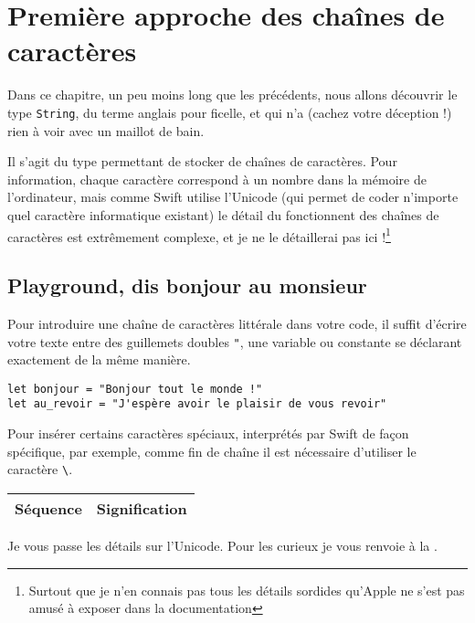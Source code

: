 \chapter{Première approche des chaînes de caractères}
Dans ce chapitre, un peu moins long que les précédents, nous allons découvrir le type \texttt{String}, du terme anglais pour ficelle, et qui n'a (cachez votre déception !) rien à voir avec un maillot de bain.

Il s'agit du type permettant de stocker de chaînes de caractères. Pour information, chaque caractère correspond à un nombre dans la mémoire de l'ordinateur, mais comme Swift utilise l'Unicode (qui permet de coder n'importe quel caractère informatique existant) le détail du fonctionnent des chaînes de caractères est extrêmement complexe, et je ne le détaillerai pas ici !\footnote{Surtout que je n'en connais pas tous les détails sordides qu'Apple ne s'est pas amusé à exposer dans la documentation}
\section{Playground, dis bonjour au monsieur}
Pour introduire une chaîne de caractères littérale dans votre code, il suffit d'écrire votre texte entre des guillemets doubles \verb'"', une variable ou constante se déclarant exactement de la même manière.
\begin{listing}[h]
\begin{verbatim}
let bonjour = "Bonjour tout le monde !"
let au_revoir = "J'espère avoir le plaisir de vous revoir"
\end{verbatim}
\end{listing}

Pour insérer certains caractères spéciaux, interprétés par Swift de façon spécifique, par exemple, comme fin de chaîne il est nécessaire d'utiliser le caractère \verb"\".
\begin{longtabu} to \linewidth {|X[1,l,m]|X[4,l,m]|}
\hline
Séquence & Signification \\ \hline
\endhead

\end{longtabu}

Je vous passe les détails sur l'Unicode. Pour les curieux je vous renvoie à la .


